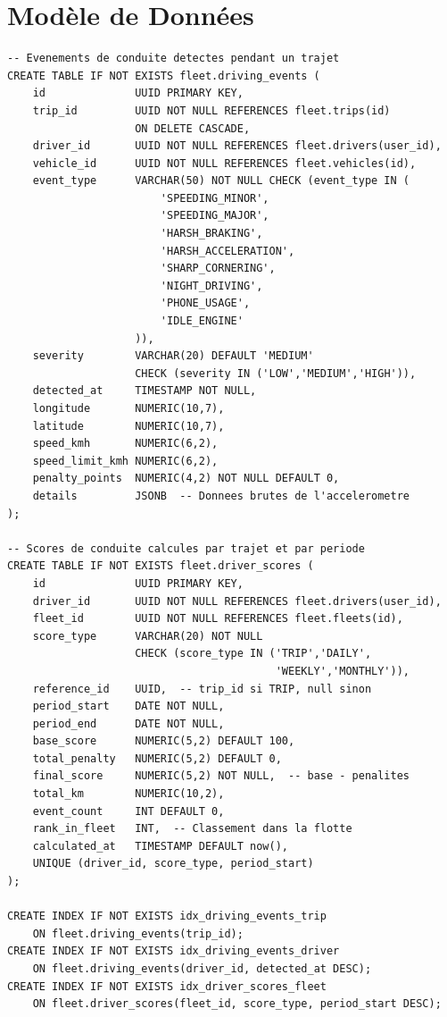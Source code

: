 \documentclass[12pt,a4paper]{report}
\begin{document}
\section{Modèle de Données}

\begin{lstlisting}[style=sqlStyle, caption={Tables du module Scoring Conducteur}]
-- Evenements de conduite detectes pendant un trajet
CREATE TABLE IF NOT EXISTS fleet.driving_events (
    id              UUID PRIMARY KEY,
    trip_id         UUID NOT NULL REFERENCES fleet.trips(id)
                    ON DELETE CASCADE,
    driver_id       UUID NOT NULL REFERENCES fleet.drivers(user_id),
    vehicle_id      UUID NOT NULL REFERENCES fleet.vehicles(id),
    event_type      VARCHAR(50) NOT NULL CHECK (event_type IN (
                        'SPEEDING_MINOR',
                        'SPEEDING_MAJOR',
                        'HARSH_BRAKING',
                        'HARSH_ACCELERATION',
                        'SHARP_CORNERING',
                        'NIGHT_DRIVING',
                        'PHONE_USAGE',
                        'IDLE_ENGINE'
                    )),
    severity        VARCHAR(20) DEFAULT 'MEDIUM'
                    CHECK (severity IN ('LOW','MEDIUM','HIGH')),
    detected_at     TIMESTAMP NOT NULL,
    longitude       NUMERIC(10,7),
    latitude        NUMERIC(10,7),
    speed_kmh       NUMERIC(6,2),
    speed_limit_kmh NUMERIC(6,2),
    penalty_points  NUMERIC(4,2) NOT NULL DEFAULT 0,
    details         JSONB  -- Donnees brutes de l'accelerometre
);

-- Scores de conduite calcules par trajet et par periode
CREATE TABLE IF NOT EXISTS fleet.driver_scores (
    id              UUID PRIMARY KEY,
    driver_id       UUID NOT NULL REFERENCES fleet.drivers(user_id),
    fleet_id        UUID NOT NULL REFERENCES fleet.fleets(id),
    score_type      VARCHAR(20) NOT NULL
                    CHECK (score_type IN ('TRIP','DAILY',
                                          'WEEKLY','MONTHLY')),
    reference_id    UUID,  -- trip_id si TRIP, null sinon
    period_start    DATE NOT NULL,
    period_end      DATE NOT NULL,
    base_score      NUMERIC(5,2) DEFAULT 100,
    total_penalty   NUMERIC(5,2) DEFAULT 0,
    final_score     NUMERIC(5,2) NOT NULL,  -- base - penalites
    total_km        NUMERIC(10,2),
    event_count     INT DEFAULT 0,
    rank_in_fleet   INT,  -- Classement dans la flotte
    calculated_at   TIMESTAMP DEFAULT now(),
    UNIQUE (driver_id, score_type, period_start)
);

CREATE INDEX IF NOT EXISTS idx_driving_events_trip
    ON fleet.driving_events(trip_id);
CREATE INDEX IF NOT EXISTS idx_driving_events_driver
    ON fleet.driving_events(driver_id, detected_at DESC);
CREATE INDEX IF NOT EXISTS idx_driver_scores_fleet
    ON fleet.driver_scores(fleet_id, score_type, period_start DESC);
\end{lstlisting}
\end{document}

